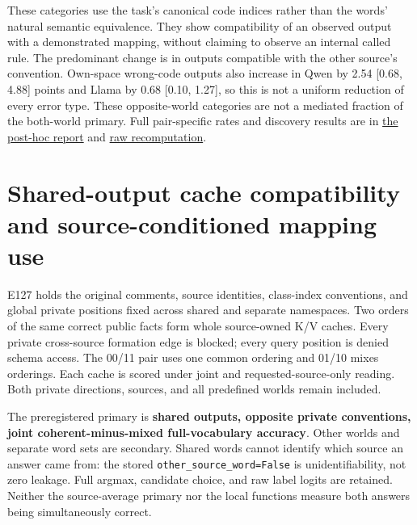 \documentclass[11pt]{article}
\begin{document}
These categories use the task's canonical code indices rather than the words' natural semantic equivalence. They show compatibility of an observed output with a demonstrated mapping, without claiming to observe an internal called rule. The predominant change is in outputs compatible with the other source's convention. Own-space wrong-code outputs also increase in Qwen by 2.54 {[}0.68, 4.88{]} points and Llama by 0.68 {[}0.10, 1.27{]}, so this is not a uniform reduction of every error type. These opposite-world categories are not a mediated fraction of the both-world primary. Full pair-specific rates and discovery results are in \href{results/e126/posthoc_selected_code.md}{the post-hoc report} and \href{scripts/posthoc_e126_selected_code.py}{raw recomputation}.

\section{Shared-output cache compatibility and source-conditioned mapping use}\label{shared-output-cache-compatibility-and-source-conditioned-mapping-use}

E127 holds the original comments, source identities, class-index conventions, and global private positions fixed across shared and separate namespaces. Two orders of the same correct public facts form whole source-owned K/V caches. Every private cross-source formation edge is blocked; every query position is denied schema access. The 00/11 pair uses one common ordering and 01/10 mixes orderings. Each cache is scored under joint and requested-source-only reading. Both private directions, sources, and all predefined worlds remain included.

The preregistered primary is \textbf{shared outputs, opposite private conventions, joint coherent-minus-mixed full-vocabulary accuracy}. Other worlds and separate word sets are secondary. Shared words cannot identify which source an answer came from: the stored \texttt{other\_source\_word=False} is unidentifiability, not zero leakage. Full argmax, candidate choice, and raw label logits are retained. Neither the source-average primary nor the local functions measure both answers being simultaneously correct.
\end{document}
